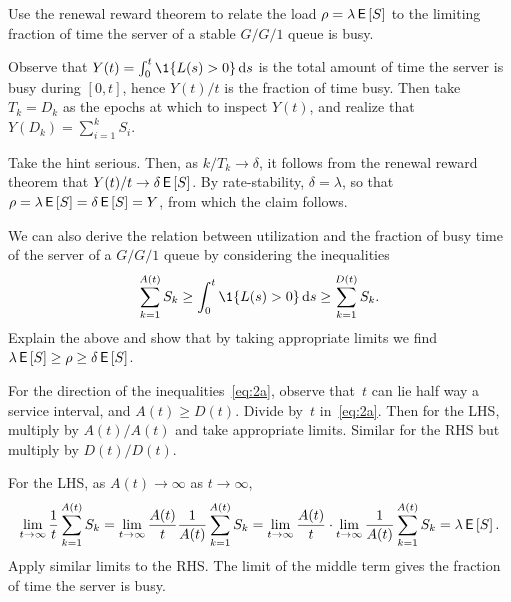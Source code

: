 \documentclass[queueing-book.tex]{subfiles}
\begin{document}
\begin{exercise}
Use the renewal reward theorem to relate the load $\rho=\lambda \,\mathsf{E}\left[S\right]$ to the limiting fraction of time the server of a stable $G/G/1$ queue is busy.
\begin{hint}
Observe that $Y(t) = \int_0^t \1{\L(s)>0} \d s$ is the total amount of time the server is busy during $[0,t]$, hence $Y(t)/t$ is the fraction of time busy.
Then take $T_k = D_k$ as the epochs at which to inspect $Y(t)$, and realize that $Y(D_{k}) = \sum_{i=1}^{k} S_{i}$.
\end{hint}
\begin{solution}
Take the hint serious. Then, as $k/T_{k} \to \delta$, it follows from the renewal reward theorem that $Y(t)/t \to \delta \,\mathsf{E}\left[S\right]$.
By rate-stability, $\delta = \lambda$, so that $\rho=\lambda \,\mathsf{E}\left[S\right] = \delta \,\mathsf{E}\left[S\right] = Y$, from which the claim follows.

\end{solution}
\end{exercise}


\begin{exercise}\label{ex:70}
We can also derive the relation between utilization and the fraction of busy time of the server of a $G/G/1$ queue by considering the inequalities
\begin{equation}\label{eq:2a}
 \sum_{k=1}^{A(t)} S_k \geq \int_0^t \1{\L(s)>0} \d s \geq \sum_{k=1}^{D(t)} S_k.
\end{equation}
Explain the above and show that by taking appropriate limits we find $\lambda \,\mathsf{E}\left[S\right] \geq \rho \geq \delta \,\mathsf{E}\left[S\right]$.
\begin{hint}
For the direction of the inequalities~\cref{eq:2a}, observe that~$t$ can lie half way a service interval, and $A(t) \geq D(t)$.
Divide by~$t$ in~\cref{eq:2a}. Then for the LHS, multiply by $A(t)/A(t)$ and take appropriate limits. Similar for the RHS but multiply by $D(t)/D(t)$.
\end{hint}
\begin{solution}
  For the LHS, as $A(t)\to \infty$ as $t\to\infty$,
\begin{equation*}
 \lim_{t\to\infty} \frac 1 t\sum_{k=1}^{A(t)} S_k =
 \lim_{t\to\infty} \frac{A(t)}t \frac{1}{A(t)} \sum_{k=1}^{A(t)} S_k =
 \lim_{t\to\infty} \frac{A(t)}t \cdot \lim_{t\to\infty}\frac{1}{A(t)} \sum_{k=1}^{A(t)} S_k = \lambda \,\mathsf{E}\left[S\right].
\end{equation*}
Apply similar limits to the RHS.
The limit of the middle term gives the fraction of time the server is busy.
\end{solution}
\end{exercise}
\end{document}
